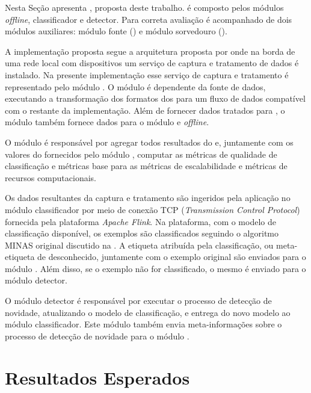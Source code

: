 \newcommand{\offline}{\emph{offline}\xspace}
\newcommand{\classify}{classificador\xspace}
\newcommand{\detector}{detector\xspace}

Nesta Seção apresenta \mfog, proposta deste trabalho.
\mfog é composto pelos módulos \offline, \classify e \detector.
Para correta avaliação \mfog é acompanhado de dois módulos auxiliares:
módulo fonte (\source) e módulo sorvedouro (\sink).


A implementação proposta segue a arquitetura proposta por
 onde na borda de uma rede local com dispositivos \iot
um serviço de captura e tratamento de dados é instalado.
Na presente implementação esse serviço de captura e tratamento é representado
pelo módulo \source.
O módulo \source é dependente da fonte de dados, executando a transformação dos
formatos dos \datasets para um fluxo de dados compatível com o restante da
implementação.
Além de fornecer dados tratados para \mfog, o módulo \source também fornece
dados para o módulo \sink e \offline.

O módulo \sink é responsável por agregar todos resultados do \mfog e, juntamente
com os valores do \dataset fornecidos pelo módulo \source, computar as métricas
de qualidade de classificação e métricas base para as métricas de
escalabilidade e métricas de recursos computacionais.

\newcommand{\flink}{\emph{Apache Flink}\xspace}

Os dados resultantes da captura e tratamento são ingeridos pela aplicação no
módulo \classify por meio de conexão TCP (\emph{Transmission Control Protocol})
fornecida pela plataforma \flink.
Na plataforma, com o modelo de classificação disponível, os exemplos são
classificados seguindo o algoritmo MINAS original discutido na .
A etiqueta atribuída pela classificação, ou meta-etiqueta de desconhecido,
juntamente com o exemplo original são enviados para o módulo \sink.
Além disso, se o exemplo não for classificado, o mesmo é enviado para o módulo
\detector.

O módulo \detector é responsável por executar o processo de detecção de
novidade, atualizando o modelo de classificação, e entrega do novo modelo
ao módulo \classify.
Este módulo também envia meta-informações sobre o processo de detecção de
novidade para o módulo \sink.

\section{Resultados Esperados}\label{sec:esperados}

